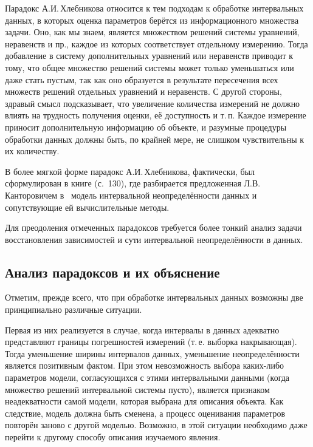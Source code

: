 \documentclass[a5paper,openany]{book}
\begin{document}
Парадокс А.И.\,Хлебникова относится к тем подходам к обработке интервальных данных, 
в которых оценка параметров берётся из информационного множества задачи. Оно, 
как мы знаем, является множеством решений системы уравнений, неравенств и пр., 
каждое из которых соответствует отдельному измерению. Тогда добавление в систему 
дополнительных уравнений или неравенств приводит к тому, что общее множество решений 
системы может только уменьшаться или даже стать пустым, так как оно образуется в 
результате пересечения всех множеств решений отдельных уравнений и неравенств. 
С другой стороны, здравый смысл подсказывает, что увеличение количества измерений 
не должно влиять на трудность получения оценки, её доступность и т.\,п. Каждое 
измерение приносит дополнительную информацию об объекте, и разумные процедуры 
обработки данных должны быть, по крайней мере, не слишком чувствительны 
к их количеству. 
  
В более мягкой форме парадокс А.И.\,Хлебникова, фактически, был сформулирован 
в книге \cite{MudrovKushko} (с.~130), где разбирается предложенная Л.В.\,Канторовичем 
в~\cite{Kantorovich} модель интервальной неопределённости данных и сопутствующие ей 
вычислительные методы. 
  
Для преодоления отмеченных парадоксов требуется более тонкий анализ задачи 
восстановления зависимостей и сути интервальной неопределённости в данных. 

  
\subsection{Анализ парадоксов и их объяснение} 
  
Отметим, прежде всего, что при обработке интервальных данных возможны две принципиально 
различные ситуации. 
  
Первая из них реализуется в случае, когда интервалы в данных адекватно представляют 
границы погрешностей измерений (т.\,е. выборка накрывающая). Тогда уменьшение ширины 
интервалов данных, уменьшение неопределённости является позитивным фактом. При этом 
невозможность выбора каких-либо параметров модели, согласующихся с этими интервальными 
данными (когда множество решений интервальной системы пусто), является признаком 
неадекватности самой модели, которая выбрана для описания объекта. Как следствие, 
модель должна быть сменена, а процесс оценивания параметров повторён заново с другой 
моделью. Возможно, в этой ситуации необходимо даже перейти к другому способу описания 
изучаемого явления. 
    
\end{document}
